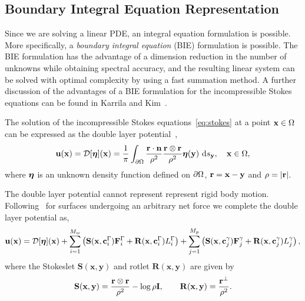 \documentclass[preprint, 10pt]{elsarticle}
\begin{document}
\subsection{Boundary Integral Equation Representation}
Since we are solving a linear PDE, an integral equation formulation is
possible.  More specifically, a {\em boundary integral equation} (BIE)
formulation is possible.  The BIE formulation has the advantage of a
dimension reduction in the number of unknowns while obtaining spectral
accuracy, and the resulting linear system can be solved with optimal
complexity by using a fast summation method.  A further discussion of
the advantages of a BIE formulation for the incompressible Stokes
equations can be found in Karrila and Kim~\cite{Karrila1989}.

The solution of the incompressible Stokes
equations~\eqref{eq:stokes} at a point ${\mathbf{x}} \in \Omega$ can be expressed
as the double layer potential~\cite{Ladyzhenskaya1963, Pozrikidis1992},
\begin{align}
  \label{eq:dlp}
  {\mathbf{u}}({\mathbf{x}}) = {\mathcal{D}}[{\boldsymbol\eta}]({\mathbf{x}}) = \frac{1}{\pi}\int_{{\partial}\Omega}
  \frac{{\mathbf{r}}\cdot\mathbf{n}}{\rho^2}\frac{{\mathbf{r}} \otimes {\mathbf{r}}}{\rho^2}
  {\boldsymbol\eta}({\mathbf{y}})~\text{d}s_{{\mathbf{y}}}, \quad {\mathbf{x}} \in \Omega,
\end{align}
where ${\boldsymbol\eta}$ is an unknown density function defined  on ${\partial}\Omega$,
${\mathbf{r}} = {\mathbf{x}} - {\mathbf{y}}$ and $\rho=|{\mathbf{r}}|$. 

The double layer potential cannot represent represent rigid body motion.  Following~\cite{Power1987,
Power1993} for surfaces undergoing an arbitrary net force we complete
the double layer potential as,
\begin{align}
  \label{eq:completed_DLP}
  {\mathbf{u}}({\mathbf{x}}) = {\mathcal{D}}[{\boldsymbol\eta}]({\mathbf{x}}) + 
             \sum_{i=1}^{M_w} \left(\mathbf{S}({\mathbf{x}},{\mathbf{c}}^\Gamma_i){\mathbf{F}}^\Gamma_i + 
                \mathbf{R}({\mathbf{x}},{\mathbf{c}}^\Gamma_i)L^\Gamma_i\right) + \sum_{j=1}^{M_p} \left(\mathbf{S}({\mathbf{x}},{\mathbf{c}}^\gamma_j){\mathbf{F}}^\gamma_j + 
                \mathbf{R}({\mathbf{x}},{\mathbf{c}}^\gamma_j)L^\gamma_j\right)  ,
\end{align}
where the Stokeslet $\mathbf{S}(\mathbf{x},\mathbf{y})$ and rotlet
$\mathbf{R}(\mathbf{x},\mathbf{y})$ are given by
\begin{align*}
  \mathbf{S}({\mathbf{x}},{\mathbf{y}}) = \frac{{\mathbf{r}} \otimes {\mathbf{r}}}{\rho^2} - 
  \log\rho\mathbf{I}, \qquad 
  \mathbf{R}({\mathbf{x}},{\mathbf{y}}) = \frac{{\mathbf{r}}^\perp}{\rho^2}.
\end{align*}
\end{document}
